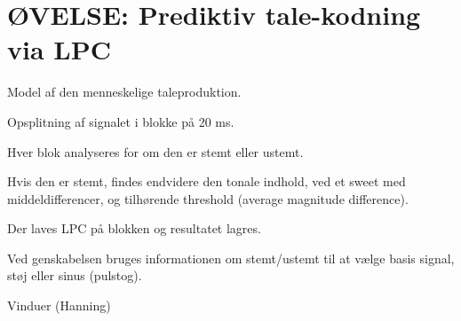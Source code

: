 \newpage
\section{ØVELSE: Prediktiv tale-kodning via LPC}
\textit{}

Model af den menneskelige taleproduktion.

Opsplitning af signalet i blokke på 20 ms.

Hver blok analyseres for om den er stemt eller ustemt.

Hvis den er stemt, findes endvidere den tonale indhold, ved et sweet
med middeldifferencer, og tilhørende threshold (average magnitude difference).

Der laves LPC på blokken og resultatet lagres.

Ved genskabelsen bruges informationen om stemt/ustemt til at vælge
basis signal, støj eller sinus (pulstog).

Vinduer (Hanning)
